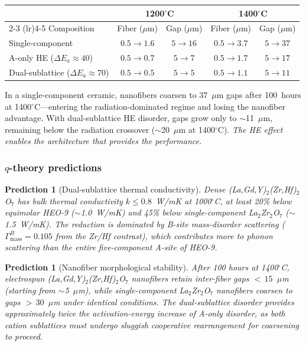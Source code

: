 \documentclass[12pt,letterpaper]{article}
\newtheorem{prediction}[theorem]{Prediction}
\theoremstyle{definition}
\begin{document}
\begin{center}
\begin{tabular}{@{}lcccc@{}}
\toprule
 & \multicolumn{2}{c}{1200$^\circ$C} & \multicolumn{2}{c}{1400$^\circ$C} \\
\cmidrule(lr){2-3} \cmidrule(lr){4-5}
Composition & Fiber ($\mu$m) & Gap ($\mu$m) & Fiber ($\mu$m) & Gap ($\mu$m) \\
\midrule
Single-component & $0.5 \to 1.6$ & $5 \to 16$ & $0.5 \to 3.7$ & $5 \to 37$ \\
A-only HE ($\Delta E_a \approx 40$) & $0.5 \to 0.7$ & $5 \to 7$ & $0.5 \to 1.7$ & $5 \to 17$ \\
Dual-sublattice ($\Delta E_a \approx 70$) & $0.5 \to 0.5$ & $5 \to 5$ & $0.5 \to 1.1$ & $5 \to 11$ \\
\bottomrule
\end{tabular}
\end{center}

In a single-component ceramic, nanofibers coarsen to 37~$\mu$m gaps after 100~hours at 1400$^\circ$C---entering the radiation-dominated regime and losing the nanofiber advantage.  With dual-sublattice HE disorder, gaps grow only to $\sim$11~$\mu$m, remaining below the radiation crossover ($\sim$20~$\mu$m at 1400$^\circ$C).  \emph{The HE effect enables the architecture that provides the performance.}

\subsubsection{$q$-theory predictions}

\begin{prediction}[Dual-sublattice thermal conductivity]\label{pred:dual_kappa}
Dense (La,Gd,Y)$_2$(Zr,Hf)$_2$O$_7$ has bulk thermal conductivity $k \leq 0.8$~W/mK at 1000$^\circ$C, at least 20\% below equimolar HEO-9 ($\sim$1.0~W/mK) and 45\% below single-component La$_2$Zr$_2$O$_7$ ($\sim$1.5~W/mK).  The reduction is dominated by B-site mass-disorder scattering ($\Gamma_{\mathrm{mass}}^B = 0.105$ from the Zr/Hf contrast), which contributes more to phonon scattering than the entire five-component A-site of HEO-9.
\end{prediction}

\begin{prediction}[Nanofiber morphological stability]\label{pred:nanofiber_stable}
After 100 hours at 1400$^\circ$C, electrospun (La,Gd,Y)$_2$(Zr,Hf)$_2$O$_7$ nanofibers retain inter-fiber gaps ${<}\,15$~$\mu$m (starting from $\sim$5~$\mu$m), while single-component La$_2$Zr$_2$O$_7$ nanofibers coarsen to gaps $>\,30$~$\mu$m under identical conditions.  The dual-sublattice disorder provides approximately twice the activation-energy increase of A-only disorder, as both cation sublattices must undergo sluggish cooperative rearrangement for coarsening to proceed.
\end{prediction}
\end{document}
